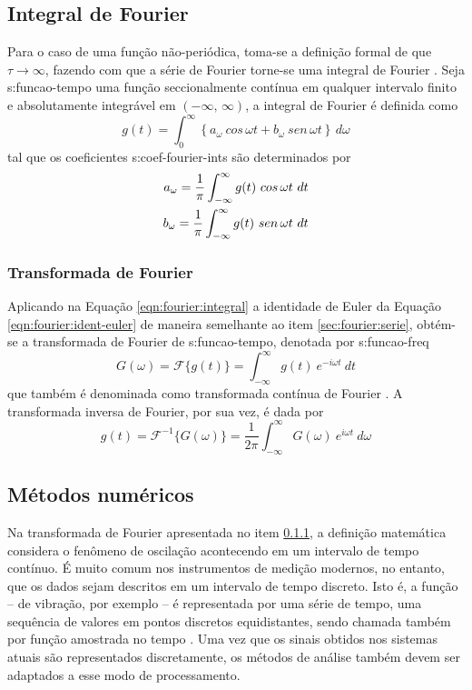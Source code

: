 \documentclass[12pt,openright,oneside,a4paper,
	chapter=TITLE,section=TITLE,
	english,brazil]{abntex2}
\begin{document}
	\subsection{Integral de Fourier}
	Para o caso de uma função não-periódica, toma-se a definição formal de que $ \tau\to\infty $, fazendo com que a série de Fourier torne-se uma integral de Fourier \cite{spiegel:1977}. Seja \gls{s:funcao-tempo} uma função seccionalmente contínua em qualquer intervalo finito e absolutamente integrável em $ (-\infty ,\,\infty) $, a integral de Fourier é definida como \cite{spiegel:1977}
	\begin{equation}\label{eqn:fourier:integral}
		g(t) = \int_{0}^{\infty}\left\lbrace a_\omega\:cos\,\omega t + b_\omega\:sen\,\omega t\right\rbrace\, d\omega
	\end{equation}
	tal que os coeficientes \glspl{s:coef-fourier-int} são determinados por
	\begin{align}
		a_\omega = \frac{1}{\pi}\int_{-\infty}^{\infty}g(t)\ cos\,\omega t\ dt \notag\\
		b_\omega = \frac{1}{\pi}\int_{-\infty}^{\infty}g(t)\ sen\,\omega t\ dt
	\end{align}
	
	\subsubsection{Transformada de Fourier} \label{sec:fourier:transform}
	Aplicando na Equação \ref{eqn:fourier:integral} a identidade de Euler da Equação \ref{eqn:fourier:ident-euler} de maneira semelhante ao item \ref{sec:fourier:serie}, obtém-se a transformada de Fourier \cite{savi:2017} de \gls{s:funcao-tempo}, denotada por \gls{s:funcao-freq}
	\begin{equation} \label{eqn:fourier:transform}
		G(\omega) = \mathcal{F}\{g(t)\} = \int_{-\infty}^{\infty}g(t)\ e^{-i\omega t}\:dt
	\end{equation}
	que também é denominada como transformada contínua de Fourier \cite{dimarogonas:1995}. A transformada inversa de Fourier, por sua vez, é dada por \cite{spiegel:1977}
	\begin{equation} \label{eqn:fourier:transform-inv}
		g(t) = \mathcal{F}^{-1}\{G(\omega)\} = \frac{1}{2\pi}\int_{-\infty}^{\infty}G(\omega)\ e^{i\omega t}\:d\omega
	\end{equation}
	
	\subsection{Métodos numéricos}
	Na transformada de Fourier apresentada no item \ref{sec:fourier:transform}, a definição matemática considera o fenômeno de oscilação acontecendo em um intervalo de tempo contínuo. É muito comum nos instrumentos de medição modernos, no entanto, que os dados sejam descritos em um intervalo de tempo discreto. Isto é, a função -- de vibração, por exemplo -- é representada por uma série de tempo, uma sequência de valores em pontos discretos equidistantes, sendo chamada também por função amostrada no tempo \cite{dimarogonas:1995}. Uma vez que os sinais obtidos nos sistemas atuais são representados discretamente, os métodos de análise também devem ser adaptados a esse modo de processamento.
	
\end{document}
